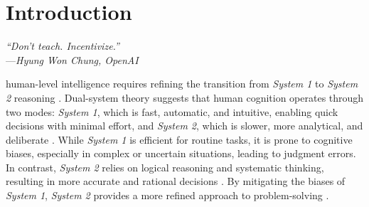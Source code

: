 \section{Introduction}
\label{sec:introduction}

\begin{flushleft}
\leftskip=1cm\emph{``Don't teach. Incentivize.''} \\
\vspace{.3em}
\leftskip=4.55cm---\emph{Hyung Won Chung, OpenAI}
\end{flushleft}



 human-level intelligence requires refining the transition from \textit{System 1} to \textit{System 2} reasoning \cite{hua2022system, wei2022chain, wangself, zhouleast, zelikman2024star}. 
Dual-system theory suggests that human cognition operates through two modes: \textit{System 1}, which is fast, automatic, and intuitive, enabling quick decisions with minimal effort, and \textit{System 2}, which is slower, more analytical, and deliberate \cite{evans1984heuristic, kahneman2003maps}. 
While \textit{System 1} is efficient for routine tasks, it is prone to cognitive biases, especially in complex or uncertain situations, leading to judgment errors. 
In contrast, \textit{System 2} relies on logical reasoning and systematic thinking, resulting in more accurate and rational decisions \cite{huang2023towards, qiao2023reasoning, wang2023towards, shaikh2023second}. 
By mitigating the biases of \textit{System 1}, \textit{System 2} provides a more refined approach to problem-solving \cite{shao2024visual, zhangautomatic, hao2023reasoning, zhang2023meta}.




